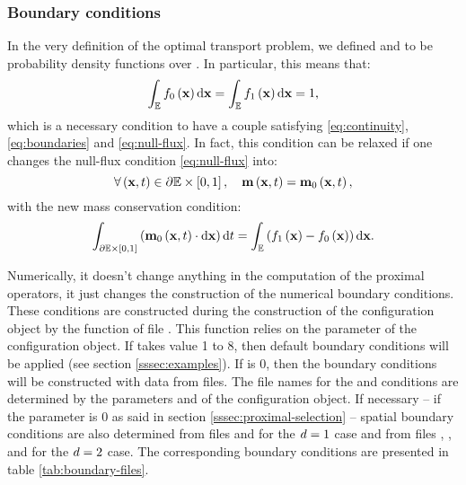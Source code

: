         \subsubsection{Boundary conditions}
        \noindent

            In the very definition of the optimal transport problem, we defined \fI{} and \fII{} to be probability
            density functions over \spaceE{}. In particular, this means that:
            \begin{equation}
                \int_{\mathbb{E}} f_0\left(\mathbf{x}\right){\rm d}\mathbf{x} = \int_{\mathbb{E}}f_1\left(\mathbf{x}\right){\rm d}\mathbf{x} = 1,
            \end{equation}
            which is a necessary condition to have a couple \coupleFM{} satisfying \eqref{eq:continuity}, \eqref{eq:boundaries}
            and \eqref{eq:null-flux}.
            In fact, this condition can be relaxed if one changes the null-flux condition \eqref{eq:null-flux} into:
            \begin{equation}
                \forall \left(\mathbf{x},t\right) \in \partial\mathbb{E}\times\left[0,1\right], \quad \mathbf{m}\left(\mathbf{x},t\right) = \mathbf{m}_0\left(\mathbf{x},t\right),
            \end{equation}
            with the new mass conservation condition:
            \begin{equation}
                \label{eq:mass-conservation}
                \int_{\partial\mathbb{E}\times\left[0,1\right]} \left(\mathbf{m}_0\left(\mathbf{x},t\right) \cdot {\rm d}\mathbf{x} \right) {\rm d}t = \int_{\mathbb{E}}\left( f_1 \left(\mathbf{x}\right) - f_0 \left(\mathbf{x}\right)\right){\rm d}\mathbf{x}.
            \end{equation}

            Numerically, it doesn't change anything in the computation of the proximal operators, it just changes
            the construction of the numerical boundary conditions. These conditions are constructed during the
            construction of the configuration object by the function  of file
            . This function relies on the parameter 
             of the configuration object. If  takes value 1 to 8, then
            default boundary conditions will be applied (see section \ref{sssec:examples}). 
            If  is 0, then the boundary conditions
            will be constructed with data from files. The file names for the \fI{} and \fII{} conditions are determined
            by the parameters  and  of the configuration object. If necessary -- \ie{} if
            the parameter  is 0 as said in section \ref{sssec:proximal-selection} -- spatial boundary conditions 
            are also determined from files  and  for the $d=1$ case and from files
            , ,  and  for the $d=2$ case.
            The corresponding boundary conditions are presented in table \ref{tab:boundary-files}.

